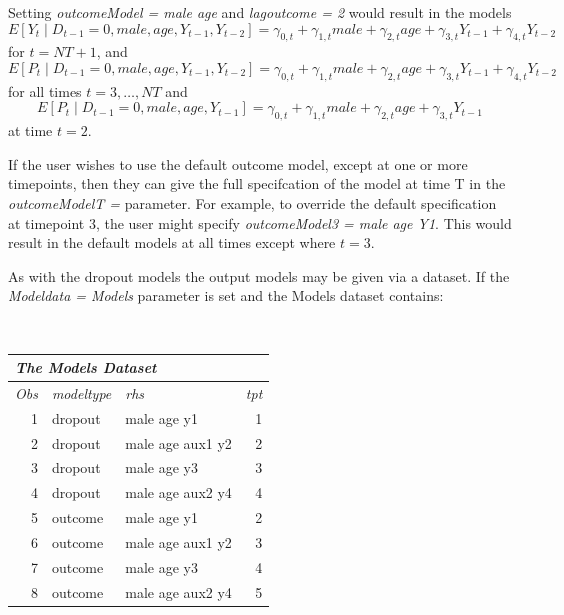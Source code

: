 \documentclass[10pt]{article}
\begin{document}
\begin{itemize}
Setting {\em outcomeModel = male age} and {\em lagoutcome = 2} would result in the models 
$$ E[ Y_{t} \mid D_{t-1} = 0, male, age, Y_{t-1}, Y_{t-2} ] = \gamma_{0,t} + \gamma_{1,t} male + \gamma_{2,t} age + \gamma_{3,t} Y_{t-1} + \gamma_{4,t} Y_{t-2}$$ for $t = NT+1$, and  
$$ E[ P_{t} \mid D_{t-1} = 0, male, age, Y_{t-1}, Y_{t-2} ] = \gamma_{0,t} + \gamma_{1,t} male + \gamma_{2,t} age + \gamma_{3,t} Y_{t-1} + \gamma_{4,t} Y_{t-2}$$ for all times $t = 3, \ldots, NT$ and
$$ E[ P_{t} \mid D_{t-1} = 0, male, age, Y_{t-1} ] = \gamma_{0,t} + \gamma_{1,t} male + \gamma_{2,t} age + \gamma_{3,t} Y_{t-1}$$
at time $t = 2$.

If the user wishes to use the default outcome model, except at one or more timepoints, then they can give the full specifcation of the model at time T in the {\em outcomeModelT = } parameter.  For example, to override the default specification at timepoint 3, the user might specify {\em outcomeModel3 = male age Y1}.  This would result in the default models at all times except where $t=3$.

As with the dropout models the output models may be given via a dataset.  If the {\em Modeldata = Models} parameter is set and the Models dataset contains:
\vspace{0.1in}

{\ }\hspace{1in}\begin{minipage}[t]{4in}
\begin{spacing}{1.1}
\begin{tabular}[l]{|r|l|l|r|}
   \multicolumn{4}{l}{\normalsize\em The Models Dataset\rule[0.0in]{0.0in}{0.0in}} \\\hline
   {\normalsize\em\em Obs }& 
   {\normalsize\em\em modeltype}&
   {\normalsize\em\em rhs}&
   {\normalsize\em\em tpt}
\\\hline
 1  &    dropout &    male age y1        &  1 \\
 2  &    dropout &    male age aux1 y2   &  2 \\ 
 3  &    dropout &    male age y3        &  3 \\
 4  &    dropout &    male age aux2 y4   &  4 \\
 5  &    outcome &    male age y1        &  2 \\
 6  &    outcome &    male age aux1 y2   &  3 \\
 7  &    outcome &    male age y3        &  4 \\
 8  &    outcome &    male age aux2 y4   &  5 
\\\hline
\end{tabular}
\end{spacing}
\end{minipage}


\end{itemize}
\end{document}
